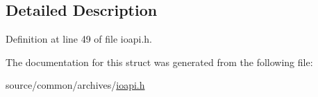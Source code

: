 \subsection{Detailed Description}


Definition at line 49 of file ioapi.\-h.



The documentation for this struct was generated from the following file\-:\begin{DoxyCompactItemize}
\item 
source/common/archives/\hyperlink{ioapi_8h}{ioapi.\-h}\end{DoxyCompactItemize}
